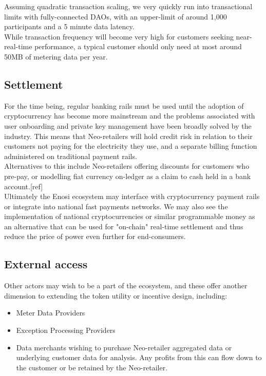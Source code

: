 \documentclass{article}
\theoremstyle{definition}
\theoremstyle{plain} %
\begin{document}
\noindent Assuming quadratic transaction scaling, we very quickly run into transactional limits with fully-connected DAOs, with an upper-limit of around 1,000 participants and a 5 minute data latency.\\

\noindent While transaction frequency will become very high for customers seeking near-real-time performance, a typical customer should only need at most around 50MB of metering data per year.

\subsection{Settlement}

\noindent For the time being, regular banking rails must be used until the adoption of cryptocurrency has become more mainstream and the problems associated with user onboarding and private key management have been broadly solved by the industry. This means that Neo-retailers will hold credit risk in relation to their customers not paying for the electricity they use, and a separate billing function administered on traditional payment rails. \\

\noindent Alternatives to this include Neo-retailers offering discounts for customers who pre-pay, or modelling fiat currency on-ledger as a claim to cash held in a bank account.[ref] \\

\noindent Ultimately the Enosi ecosystem may interface with cryptocurrency payment rails or integrate into national fast payments networks. We may also see the implementation of national cryptocurrencies or similar programmable money as an alternative that can be used for "on-chain" real-time settlement and thus reduce the price of power even further for end-consumers.

\subsection{External access}

Other actors may wish to be a part of the ecosystem, and these offer another dimension to extending the token utility or incentive design, including:

\begin{itemize}
\item{Meter Data Providers}
\item{Exception Processing Providers}
\item{Data merchants wishing to purchase Neo-retailer aggregated data or underlying customer data for analysis. Any profits from this can flow down to the customer or be retained by the Neo-retailer.}
\end{itemize}
\end{document}
